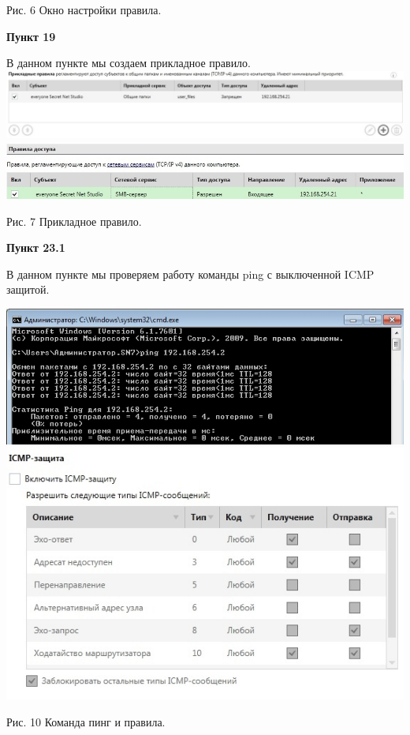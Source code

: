 \documentclass[a4paper,14pt]{extarticle}
\begin{document}
\begin{center}
\begin{multicols}{2}
        \end{multicols}

       Рис. 6 Окно настройки правила.
    \end{center}

    \newpage
    \textbf{Пункт 19}
    \begin{center}
        В данном пункте мы создаем прикладное правило.
        \includegraphics[scale=0.42]{pics/19_1.jpg}\\
        \includegraphics[scale=0.55]{pics/19_2.jpg}

        Рис. 7 Прикладное правило.
    \end{center}
  
    \textbf{Пункт 23.1}
    \begin{center}
        В данном пункте мы проверяем работу команды ping с выключенной ICMP защитой.
        \begin{multicols}{2}
            \includegraphics[scale=0.4]{pics/23.1_1.jpg}
            \includegraphics[scale=0.4]{pics/23.1_2.jpg}
        \end{multicols}

        Рис. 10 Команда пинг и правила.
    \end{center}
\end{document}
